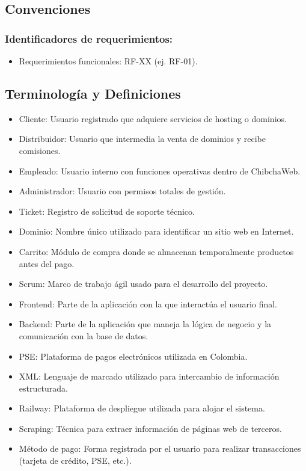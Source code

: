 \subsection{Convenciones}

\subsubsection*{Identificadores de requerimientos:}
\begin{itemize}
	\item Requerimientos funcionales: RF-XX (ej. RF-01).
\end{itemize}


\subsection{Terminología y Definiciones}

\begin{itemize}
\item Cliente: Usuario registrado que adquiere servicios de hosting o dominios.
\item Distribuidor: Usuario que intermedia la venta de dominios y recibe comisiones.
\item Empleado: Usuario interno con funciones operativas dentro de ChibchaWeb.
\item Administrador: Usuario con permisos totales de gestión.
\item Ticket: Registro de solicitud de soporte técnico.
\item Dominio: Nombre único utilizado para identificar un sitio web en Internet.
\item Carrito: Módulo de compra donde se almacenan temporalmente productos antes del pago.
\item Scrum: Marco de trabajo ágil usado para el desarrollo del proyecto.
\item Frontend: Parte de la aplicación con la que interactúa el usuario final.
\item Backend: Parte de la aplicación que maneja la lógica de negocio y la comunicación con la base de datos.
\item PSE: Plataforma de pagos electrónicos utilizada en Colombia.
\item XML: Lenguaje de marcado utilizado para intercambio de información estructurada.
\item Railway: Plataforma de despliegue utilizada para alojar el sistema.
\item Scraping: Técnica para extraer información de páginas web de terceros.
\item Método de pago: Forma registrada por el usuario para realizar transacciones (tarjeta de crédito, PSE, etc.).
\end{itemize}
